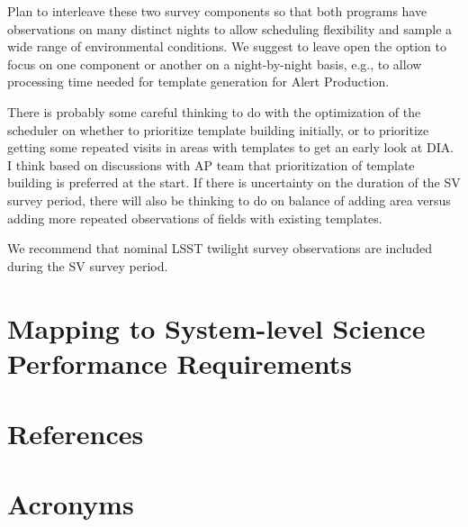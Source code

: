 \documentclass[SE,authoryear,toc,lsstdraft]{lsstdoc}
\begin{document}
Plan to interleave these two survey components so that both programs have observations on many distinct nights to allow scheduling flexibility and sample a wide range of environmental conditions.
We suggest to leave open the option to focus on one component or another on a night-by-night basis, e.g., to allow processing time needed for template generation for Alert Production.

There is probably some careful thinking to do with the optimization of the scheduler on whether to prioritize template building initially, or to prioritize getting some repeated visits in areas with templates to get an early look at DIA.
I think based on discussions with AP team that prioritization of template building is preferred at the start.
If there is uncertainty on the duration of the SV survey period, there will also be thinking to do on balance of adding area versus adding more repeated observations of fields with existing templates.

We recommend that nominal LSST twilight survey observations are included during the SV survey period.





\section{Mapping to System-level Science Performance Requirements}

\appendix
\section{References} \label{sec:bib}
\renewcommand{\refname}{} %


\section{Acronyms} \label{sec:acronyms}

\end{document}
